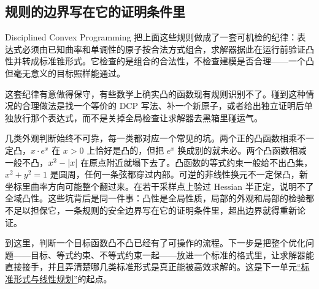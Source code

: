 \subsection{规则的边界写在它的证明条件里}

Disciplined Convex Programming 把上面这些规则做成了一套可机检的纪律：表达式必须由已知曲率和单调性的原子按合法方式组合，求解器据此在运行前验证凸性并转成标准锥形式。它检查的是组合的合法性，不检查建模是否合理——一个凸但毫无意义的目标照样能通过。

这套纪律有意做得保守，有些数学上确实凸的函数现有规则识别不了。碰到这种情况的合理做法是找一个等价的 DCP 写法、补一个新原子，或者给出独立证明后单独放行那个表达式，而不是关掉全局检查让求解器去黑箱里碰运气。

几类外观判断始终不可靠，每一类都对应一个常见的坑。两个正的凸函数相乘不一定凸，\(x\cdot e^x\) 在 \(x>0\) 上恰好是凸的，但把 \(e^x\) 换成别的就未必。两个凸函数相减一般不凸，\(x^2-\left|x\right|\) 在原点附近就塌下去了。凸函数的等式约束一般给不出凸集，\(x^2+y^2=1\) 是圆周，任何一条弦都穿过内部。可逆的非线性换元不一定保凸，新坐标里曲率方向可能整个翻过来。在若干采样点上验过 Hessian 半正定，说明不了全域凸性。这些坑背后是同一件事：凸性是全局性质，局部的外观和局部的检验都不足以担保它，一条规则的安全边界写在它的证明条件里，超出边界就得重新论证。

到这里，判断一个目标函数凸不凸已经有了可操作的流程。下一步是把整个优化问题——目标、等式约束、不等式约束一起——放进一个标准的格式里，让求解器能直接接手，并且弄清楚哪几类标准形式是真正能被高效求解的。这是下一单元\hyperref[sec:09-Convex-Optimization/04-Convex-Problems/01]{``标准形式与线性规划''}的起点。
